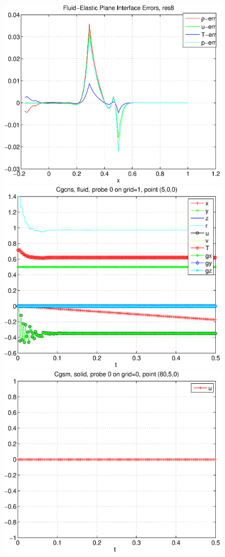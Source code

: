 {\begin{figure}[h]
\includegraphics[width=\fwidth]{fluidElastic_planeInterfacehErr_res8.eps}
\includegraphics[width=\fwidth]{planeInterfaceProbe8hFluid1.eps}
\includegraphics[width=\fwidth]{planeInterfaceProbe8hSolid1.eps}

\end{figure}}
